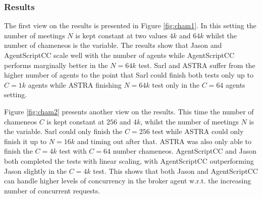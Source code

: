\subsubsection{Results} 

The first view on the results is presented in Figure \ref{fig:cham1}. In this setting the number of meetings $N$ is kept constant at two values $4k$ and $64k$ whilst the number of chameneos is the variable. The results show that Jason and AgentScriptCC scale well with the number of agents while AgentScriptCC performs marginally better in the $N=64k$ test. Sarl and ASTRA suffer from the higher number of agents to the point that Sarl could finish both tests only up to $C=1k$ agents while ASTRA finishing $N=64k$ test only in the $C=64$ agents setting.

Figure \ref{fig:cham2} presents another view on the results. This time the number of chameneos $C$ is kept constant at $256$ and $4k$, whilst the number of meetings $N$ is the variable. Sarl could only finish the $C=256$ test while ASTRA could only finish it up to $N=16k$ and timing out after that. ASTRA was also only able to finish the $C=4k$ test with $C=64$ number chameneos. AgentScriptCC and Jason both completed the tests with linear scaling, with AgentScriptCC outperforming Jason slightly in the $C=4k$ test. This shows that both Jason and AgentScriptCC can handle higher levels of concurrency in the broker agent w.r.t. the increasing number of concurrent requests.

